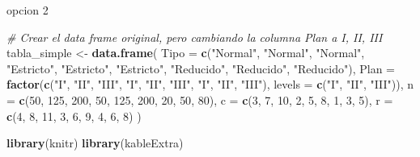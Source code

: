\documentclass[
  12pt,
]{article}
\newenvironment{Shaded}{\begin{snugshade}}{\end{snugshade}}
\newcommand{\AttributeTok}[1]{\textcolor[rgb]{0.13,0.29,0.53}{#1}}
\newcommand{\CommentTok}[1]{\textcolor[rgb]{0.56,0.35,0.01}{\textit{#1}}}
\newcommand{\DecValTok}[1]{\textcolor[rgb]{0.00,0.00,0.81}{#1}}
\newcommand{\FunctionTok}[1]{\textcolor[rgb]{0.13,0.29,0.53}{\textbf{#1}}}
\newcommand{\NormalTok}[1]{#1}
\newcommand{\OtherTok}[1]{\textcolor[rgb]{0.56,0.35,0.01}{#1}}
\newcommand{\StringTok}[1]{\textcolor[rgb]{0.31,0.60,0.02}{#1}}
\begin{document}
opcion 2

\begin{Shaded}
\begin{Highlighting}[]
\CommentTok{\# Crear el data frame original, pero cambiando la columna Plan a I, II, III}
\NormalTok{tabla\_simple }\OtherTok{\textless{}{-}} \FunctionTok{data.frame}\NormalTok{(}
  \AttributeTok{Tipo =} \FunctionTok{c}\NormalTok{(}\StringTok{"Normal"}\NormalTok{, }\StringTok{"Normal"}\NormalTok{, }\StringTok{"Normal"}\NormalTok{,}
           \StringTok{"Estricto"}\NormalTok{, }\StringTok{"Estricto"}\NormalTok{, }\StringTok{"Estricto"}\NormalTok{,}
           \StringTok{"Reducido"}\NormalTok{, }\StringTok{"Reducido"}\NormalTok{, }\StringTok{"Reducido"}\NormalTok{),}
  \AttributeTok{Plan =} \FunctionTok{factor}\NormalTok{(}\FunctionTok{c}\NormalTok{(}\StringTok{"I"}\NormalTok{, }\StringTok{"II"}\NormalTok{, }\StringTok{"III"}\NormalTok{, }\StringTok{"I"}\NormalTok{, }\StringTok{"II"}\NormalTok{, }\StringTok{"III"}\NormalTok{, }\StringTok{"I"}\NormalTok{, }\StringTok{"II"}\NormalTok{, }\StringTok{"III"}\NormalTok{),}
                \AttributeTok{levels =} \FunctionTok{c}\NormalTok{(}\StringTok{"I"}\NormalTok{, }\StringTok{"II"}\NormalTok{, }\StringTok{"III"}\NormalTok{)),}
  \AttributeTok{n =} \FunctionTok{c}\NormalTok{(}\DecValTok{50}\NormalTok{, }\DecValTok{125}\NormalTok{, }\DecValTok{200}\NormalTok{, }\DecValTok{50}\NormalTok{, }\DecValTok{125}\NormalTok{, }\DecValTok{200}\NormalTok{, }\DecValTok{20}\NormalTok{, }\DecValTok{50}\NormalTok{, }\DecValTok{80}\NormalTok{),}
  \AttributeTok{c =} \FunctionTok{c}\NormalTok{(}\DecValTok{3}\NormalTok{, }\DecValTok{7}\NormalTok{, }\DecValTok{10}\NormalTok{, }\DecValTok{2}\NormalTok{, }\DecValTok{5}\NormalTok{, }\DecValTok{8}\NormalTok{, }\DecValTok{1}\NormalTok{, }\DecValTok{3}\NormalTok{, }\DecValTok{5}\NormalTok{),}
  \AttributeTok{r =} \FunctionTok{c}\NormalTok{(}\DecValTok{4}\NormalTok{, }\DecValTok{8}\NormalTok{, }\DecValTok{11}\NormalTok{, }\DecValTok{3}\NormalTok{, }\DecValTok{6}\NormalTok{, }\DecValTok{9}\NormalTok{, }\DecValTok{4}\NormalTok{, }\DecValTok{6}\NormalTok{, }\DecValTok{8}\NormalTok{)}
\NormalTok{)}

\FunctionTok{library}\NormalTok{(knitr)}
\FunctionTok{library}\NormalTok{(kableExtra)}


\end{Highlighting}
\end{Shaded}
\end{document}
